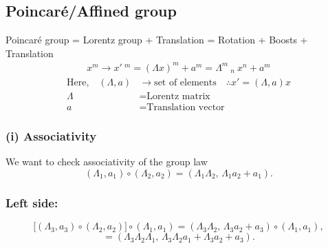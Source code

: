 \documentclass[14pt]{article} %
\begin{document}
\subsection{Poincaré/Affined group}
Poincaré group = Lorentz group + Translation 
= Rotation + Boosts + Translation 
\begin{align*}
x^m \rightarrow x'~^m = (\Lambda x)^m + a^m = \Lambda^{m}~_{n}~x^n + a^m
\end{align*}
\begin{align*}
    \text{Here,} \quad (\Lambda, a) &\rightarrow \text{set of elements} \quad  \therefore x' = (\Lambda, a)x \\
    \Lambda &= \text{Lorentz matrix} \\
    a &= \text{Translation vector}
\end{align*}

\subsubsection*{(i) Associativity}
We want to check associativity of the group law
\[
(\Lambda_1,a_1)\circ (\Lambda_2,a_2) = (\Lambda_1 \Lambda_2, \, \Lambda_1 a_2 + a_1).
\]

\subsubsection*{Left side:}
\[
\bigl[(\Lambda_3,a_3)\circ (\Lambda_2,a_2)\bigr]\circ (\Lambda_1,a_1) 
= (\Lambda_3 \Lambda_2, \, \Lambda_3 a_2 + a_3)\circ (\Lambda_1,a_1),
\]
\[
= (\Lambda_3 \Lambda_2 \Lambda_1, \, \Lambda_3 \Lambda_2 a_1 + \Lambda_3 a_2 + a_3).
\]
\end{document}
